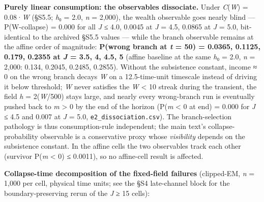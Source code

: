 \documentclass[11pt,letterpaper]{article}
\begin{document}
\textbf{Purely linear consumption: the observables dissociate.} Under \emph{C}(\emph{W}) = 0.08·\emph{W} (§S5.5; \emph{h}₀ = 2.0, \emph{n} = 2,000), the wealth observable goes nearly blind --- P(W-collapse) = 0.000 for all \emph{J} ≤ 4.0, 0.0045 at \emph{J} = 4.5, 0.0865 at \emph{J} = 5.0, bit-identical to the archived §S5.5 values --- while the branch observable remains at the affine order of magnitude: \textbf{P(wrong branch at \emph{t} = 50) = 0.0365, 0.1125, 0.179, 0.2355 at \emph{J} = 3.5, 4, 4.5, 5} (affine baseline at the same \emph{h}₀ = 2.0, \emph{n} = 2,000: 0.134, 0.2045, 0.2485, 0.2855). Without the subsistence constant, income ≈ 0 on the wrong branch decays \emph{W} on a 12.5-time-unit timescale instead of driving it below threshold; \emph{W} never satisfies the \emph{W} \textless{} 10 streak during the transient, the field \emph{h} = 2(\emph{W}/500) stays large, and nearly every wrong-branch run is eventually pushed back to \emph{m} \textgreater{} 0 by the end of the horizon (P(\emph{m} \textless{} 0 at end) = 0.000 for \emph{J} ≤ 4.5 and 0.007 at \emph{J} = 5.0, \texttt{e2\_dissociation.csv}). The branch-selection pathology is thus consumption-rule independent; the main text's collapse-probability observable is a conservative proxy whose \emph{visibility} depends on the subsistence constant. In the affine cells the two observables track each other (survivor P(\emph{m} \textless{} 0) ≤ 0.0011), so no affine-cell result is affected.

\textbf{Collapse-time decomposition of the fixed-field failures} (clipped-EM, \emph{n} = 1,000 per cell, physical time units; see the §S4 late-channel block for the boundary-preserving rerun of the \emph{J} ≥ 15 cells):
\end{document}
